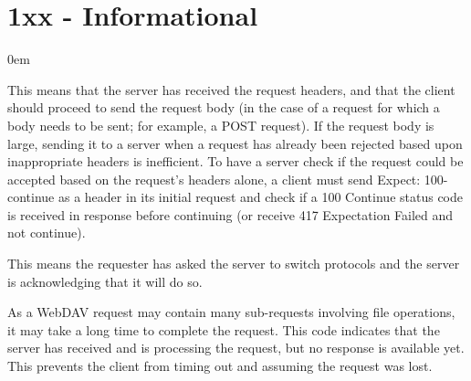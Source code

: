 \section{1xx - Informational}
\begin{description}\itemsep0em
	\item [100 - Continue] This means that the server has received the request headers, and that the client should proceed to send the request body (in the case of a request for which a body needs to be sent; for example, a POST request). If the request body is large, sending it to a server when a request has already been rejected based upon inappropriate headers is inefficient. To have a server check if the request could be accepted based on the request's headers alone, a client must send Expect: 100-continue as a header in its initial request and check if a 100 Continue status code is received in response before continuing (or receive 417 Expectation Failed and not continue).

	\item [101 - Switching Protocols] This means the requester has asked the server to switch protocols and the server is acknowledging that it will do so.

	\item [102 - Processing (WebDAV)] As a WebDAV request may contain many sub-requests involving file operations, it may take a long time to complete the request. This code indicates that the server has received and is processing the request, but no response is available yet. This prevents the client from timing out and assuming the request was lost.

\end{description}
